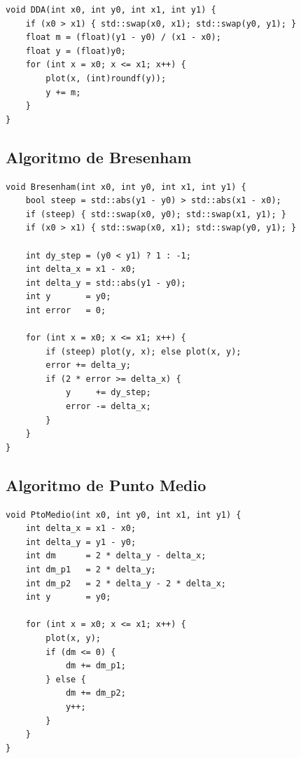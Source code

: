 \documentclass[12pt,a4paper]{article}
\begin{document}
\begin{lstlisting}[caption={Implementación DDA}]
void DDA(int x0, int y0, int x1, int y1) {
    if (x0 > x1) { std::swap(x0, x1); std::swap(y0, y1); }
    float m = (float)(y1 - y0) / (x1 - x0);
    float y = (float)y0;
    for (int x = x0; x <= x1; x++) {
        plot(x, (int)roundf(y));
        y += m;
    }
}
\end{lstlisting}

\subsection{Algoritmo de Bresenham}

\begin{lstlisting}[caption={Implementación Bresenham (todos los octantes)}]
void Bresenham(int x0, int y0, int x1, int y1) {
    bool steep = std::abs(y1 - y0) > std::abs(x1 - x0);
    if (steep) { std::swap(x0, y0); std::swap(x1, y1); }
    if (x0 > x1) { std::swap(x0, x1); std::swap(y0, y1); }

    int dy_step = (y0 < y1) ? 1 : -1;
    int delta_x = x1 - x0;
    int delta_y = std::abs(y1 - y0);
    int y       = y0;
    int error   = 0;

    for (int x = x0; x <= x1; x++) {
        if (steep) plot(y, x); else plot(x, y);
        error += delta_y;
        if (2 * error >= delta_x) {
            y     += dy_step;
            error -= delta_x;
        }
    }
}
\end{lstlisting}

\subsection{Algoritmo de Punto Medio}

\begin{lstlisting}[caption={Implementación Punto Medio (primer octante)}]
void PtoMedio(int x0, int y0, int x1, int y1) {
    int delta_x = x1 - x0;
    int delta_y = y1 - y0;
    int dm      = 2 * delta_y - delta_x;
    int dm_p1   = 2 * delta_y;
    int dm_p2   = 2 * delta_y - 2 * delta_x;
    int y       = y0;

    for (int x = x0; x <= x1; x++) {
        plot(x, y);
        if (dm <= 0) {
            dm += dm_p1;
        } else {
            dm += dm_p2;
            y++;
        }
    }
}
\end{lstlisting}
\end{document}
